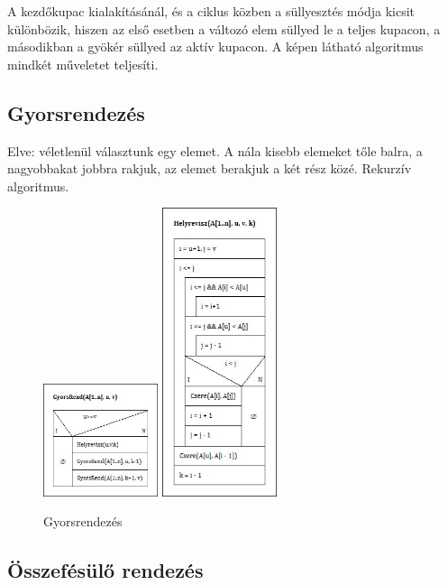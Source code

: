 \documentclass[margin=0px]{article}
\begin{document}
	A kezdőkupac kialakításánál, és a ciklus közben a süllyesztés módja kicsit különbözik, hiszen az első esetben a változó elem süllyed le a teljes kupacon, a másodikban a gyökér süllyed az aktív kupacon. A képen látható algoritmus mindkét műveletet teljesíti.
	
	\subsection{Gyorsrendezés}
	
	Elve: véletlenül választunk egy elemet. A nála kisebb elemeket tőle balra, a nagyobbakat jobbra rakjuk, az elemet berakjuk a két rész közé. Rekurzív algoritmus.
	\begin{figure}[H]
		\centering
		\includegraphics[width=0.3\textwidth]{img/GyorsRend.jpg}
		\includegraphics[width=0.3\textwidth]{img/Helyrevisz.jpg}
		\caption{Gyorsrendezés}
	\end{figure}
	
	\subsection{Összefésülő rendezés}
	
\end{document}
